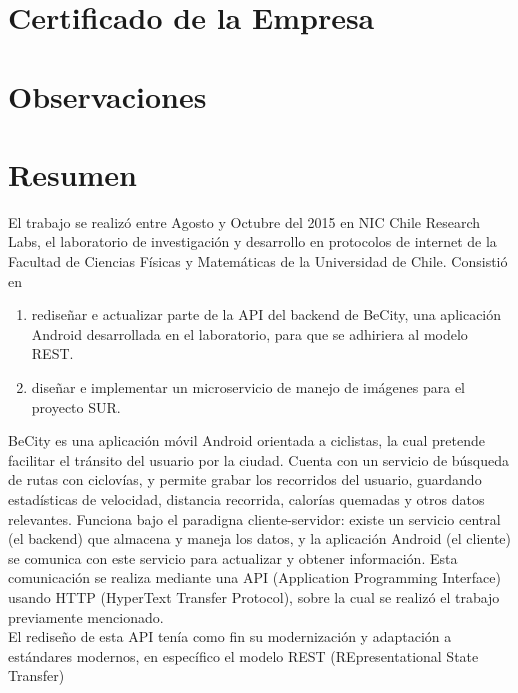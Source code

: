 \documentclass[11pt,letterpaper]{article}
\begin{document}
\renewcommand{\sectionmark}[1]{\markright{\thesection.\ #1}}
\renewcommand{\headrulewidth}{0.5pt}
\renewcommand{\footrulewidth}{0.5pt}

\newpage
\section{Certificado de la Empresa}
\newpage
\section{Observaciones}
\newpage

\tableofcontents
\listoffigures

\newpage
\section{Resumen}

El trabajo se realizó entre Agosto y Octubre del 2015 en NIC Chile Research Labs, el laboratorio de investigación y desarrollo en protocolos de internet de la Facultad de Ciencias Físicas y Matemáticas de la Universidad de Chile. \@ Consistió en
\begin{enumerate}
    \item rediseñar e actualizar parte de la API del backend de BeCity, una aplicación Android desarrollada en el laboratorio, para que se adhiriera al modelo REST.
    \item diseñar e implementar un microservicio de manejo de imágenes para el proyecto SUR.
\end{enumerate}

BeCity es una aplicación móvil Android orientada a ciclistas, la cual pretende facilitar el tránsito del usuario por la ciudad. Cuenta con un servicio de búsqueda de rutas con ciclovías, y permite grabar los recorridos del usuario, guardando estadísticas de velocidad, distancia recorrida, calorías quemadas y otros datos relevantes. Funciona bajo el paradigna cliente-servidor: existe un servicio central (el backend) que almacena y maneja los datos, y la aplicación Android (el cliente) se comunica con este servicio para actualizar y obtener información. Esta comunicación se realiza mediante una API (Application Programming Interface) usando HTTP (HyperText Transfer Protocol), sobre la cual se realizó el trabajo previamente mencionado.\\

El rediseño de esta API tenía como fin su modernización y adaptación a estándares modernos, en específico el modelo REST (REpresentational State Transfer)\\
\end{document}
